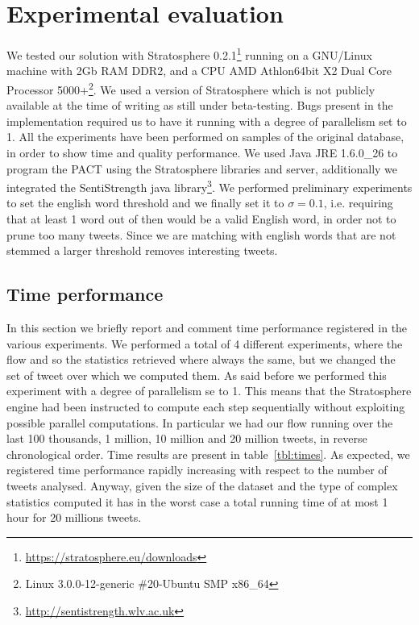 \section{Experimental evaluation}
\label{sec:results}
We tested our solution with Stratosphere 0.2.1\footnote{\url{https://stratosphere.eu/downloads}} running on a GNU/Linux machine with 2Gb RAM DDR2, and a CPU AMD Athlon\texttrademark 64bit X2 Dual Core Processor 5000+\footnote{Linux 3.0.0-12-generic \#20-Ubuntu SMP x86\_64}. 
We used a version of Stratosphere which is not publicly available at the time of writing as still under beta-testing.
Bugs present in the implementation required us to have it running with a degree of parallelism set to 1.
All the experiments have been performed on samples of the original database, in order to show time and quality performance. 
We used Java JRE 1.6.0\_26 to program the PACT using the Stratosphere libraries and server, additionally we integrated the SentiStrength java library\footnote{\url{http://sentistrength.wlv.ac.uk}}. 
We performed preliminary experiments to set the english word threshold and we finally set it to $\sigma=0.1$, i.e. requiring that at least 1 word out of then would be a valid English word, in order not to prune too many tweets. 
Since we are matching with english words that are not stemmed a larger threshold removes interesting tweets.  

\subsection{Time performance}
In this section we briefly report and comment time performance registered in the various experiments.
We performed a total of 4 different experiments, where the flow and so the statistics retrieved where always the same, but we changed the set of tweet over which we computed them.
As said before we performed this experiment with a degree of parallelism se to 1.
This means that the Stratosphere engine had been instructed to compute each step sequentially without exploiting possible parallel computations.
In particular we had our flow running over the last 100 thousands, 1 million, 10 million and 20 million tweets, in reverse chronological order.
Time results are present in table~\ref{tbl:times}. 
As expected, we registered time performance rapidly increasing with respect to the number of tweets analysed.
Anyway, given the size of the dataset and the type of complex statistics computed it has in the worst case a total running time of at most 1 hour for 20 millions tweets.

